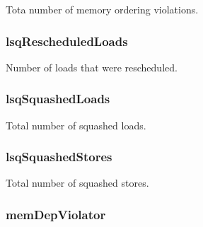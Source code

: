 \label{classLSQUnit_ac499fc2b461e03a110deae7c695f75bc}
Tota number of memory ordering violations. \hypertarget{classLSQUnit_af5c24658bed91065bf7d69d27ba9fbd6}{
\subsubsection[{lsqRescheduledLoads}]{ {\bf lsqRescheduledLoads}}}
\label{classLSQUnit_af5c24658bed91065bf7d69d27ba9fbd6}
Number of loads that were rescheduled. \hypertarget{classLSQUnit_a737697c5df3fbe8e728541fec8220089}{
\subsubsection[{lsqSquashedLoads}]{ {\bf lsqSquashedLoads}}}
\label{classLSQUnit_a737697c5df3fbe8e728541fec8220089}
Total number of squashed loads. \hypertarget{classLSQUnit_a0abe80f8caefb71a0351c3bed4d99c0e}{
\subsubsection[{lsqSquashedStores}]{ {\bf lsqSquashedStores}}}
\label{classLSQUnit_a0abe80f8caefb71a0351c3bed4d99c0e}
Total number of squashed stores. \hypertarget{classLSQUnit_a270a20c3fa52139e0538288275db9d22}{
\subsubsection[{memDepViolator}]{ {\bf memDepViolator}}}
\label{classLSQUnit_a270a20c3fa52139e0538288275db9d22}
